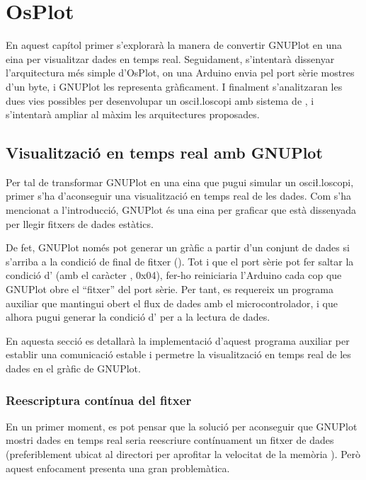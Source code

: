 \documentclass{tfgitic}[2023/07/07]
\begin{document}
\chapter{OsPlot}

En aquest capítol primer s'explorarà la manera de convertir GNUPlot en
una eina per visualitzar dades en temps real. Seguidament, s'intentarà
dissenyar l'arquitectura més simple d'OsPlot, on una Arduino envia pel
port sèrie mostres d'un byte, i GNUPlot les representa gràficament. I
finalment s'analitzaran les dues vies possibles per desenvolupar un
osci\l.loscopi amb sistema de , i s'intentarà ampliar al
màxim les arquitectures proposades.

\section{Visualització en temps real amb GNUPlot}

Per tal de transformar GNUPlot en una eina que pugui simular un
osci\l.loscopi, primer s'ha d'aconseguir una visualització en temps
real de les dades. Com s'ha mencionat a l'introducció, GNUPlot és una
eina per graficar que està dissenyada per llegir fitxers de dades
estàtics.

De fet, GNUPlot només pot generar un gràfic a partir d'un conjunt de
dades si s'arriba a la condició de final de fitxer (). Tot i
que el port sèrie pot fer saltar la condició d' (amb el
caràcter , 0x04), fer-ho reiniciaria l'Arduino cada cop que
GNUPlot obre el ``fitxer'' del port sèrie. Per tant, es requereix un
programa auxiliar que mantingui obert el flux de dades amb el
microcontrolador, i que alhora pugui generar la condició d'
per a la lectura de dades.

En aquesta secció es detallarà la implementació d'aquest programa
auxiliar per establir una comunicació estable i permetre la
visualització en temps real de les dades en el gràfic de GNUPlot.

\subsection{Reescriptura contínua del fitxer}

En un primer moment, es pot pensar que la solució per aconseguir que
GNUPlot mostri dades en temps real seria reescriure contínuament un
fitxer de dades (preferiblement ubicat al directori  per
aprofitar la velocitat de la memòria ). Però aquest
enfocament presenta una gran problemàtica.
\end{document}
